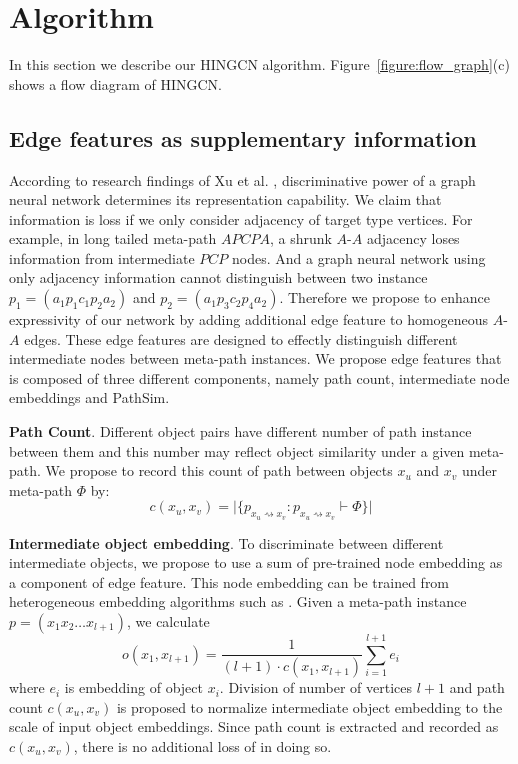 \section{Algorithm}
\label{sec:algorithm}

In this section we describe our HINGCN algorithm. Figure~\ref{figure:flow_graph}(c) shows a flow diagram of HINGCN. 

\subsection{Edge features as supplementary information}
\label{sec:edge}
According to research findings of Xu et al. \cite{XuHLJ19}, discriminative power of a graph neural network determines its representation capability.
We claim that information is loss if we only consider adjacency of target type vertices. 
For example, in long tailed meta-path $APCPA$, a shrunk $A$-$A$ adjacency loses information from intermediate $PCP$ nodes. And a graph neural network using only adjacency information cannot distinguish between two instance $p_1 = (a_1 p_1 c_1 p_2 a_2)$ and $p_2 = (a_1 p_3 c_2 p_4 a_2)$. 
Therefore we propose to enhance expressivity of our network by adding additional edge feature to homogeneous $A$-$A$ edges. These edge features are designed to effectly distinguish different intermediate nodes between meta-path instances.
We propose edge features that is composed of three different components, namely path count, intermediate node embeddings and PathSim\citep{SunHYYW11}.

\noindent{\small$\bullet$}\textbf{Path Count}. Different object pairs have different number of path instance between them and this number may reflect object similarity under a given meta-path. We propose to record this count of path between objects $x_u$ and $x_v$ under meta-path $\Phi$ by: 
\begin{equation*}
c(x_u,x_v) = \vert\{ p_{x_u \rightsquigarrow x_v}:p_{x_u \rightsquigarrow x_v} \vdash \Phi \}\vert
\end{equation*}

\noindent{\small$\bullet$}\textbf{Intermediate object embedding}. 
To discriminate between different intermediate objects, we propose to use a sum of pre-trained node embedding as a component of edge feature. This node embedding can be trained from heterogeneous embedding algorithms such as \cite{GroverL16,DongCS17}.
Given a meta-path instance $p = (x_1x_2\ldots x_{l+1})$, we calculate
\begin{equation*}
o(x_1,x_{l+1}) = \dfrac{1}{(l+1) \cdot c(x_1,x_{l+1})} \sum\limits_{i=1}^{l+1} e_i
\end{equation*}
where $e_i$ is embedding of object $x_i$. Division of number of vertices $l+1$ and path count $c(x_u,x_v)$ is proposed to normalize intermediate object embedding to the scale of input object embeddings. Since path count is extracted and recorded as $c(x_u,x_v)$, there is no additional loss of in doing so.

